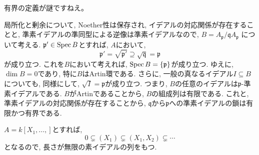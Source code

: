 \documentclass[dvipdfmx]{jsarticle}
\begin{document}
    \begin{problem}
        \color{red}
            有界の定義が謎ですねえ。
        \color{black}
    \end{problem}


    \begin{problem}
        局所化と剰余について, Noether性は保存され, イデアルの対応関係が存在することと,
        準素イデアルの準同型による逆像は準素イデアルなので,
        $B = A_\mathfrak{p}/\mathfrak{q}A_\mathfrak{p}$
        について考える.
        $\mathfrak{p}' \in \operatorname{Spec}{B}$とすれば, $A$において,
        \[
            \mathfrak{p}' = \sqrt{\mathfrak{p}'} \supseteq \sqrt{\mathfrak{q}} = \mathfrak{p}
        \]
        が成り立つ.
        これを$B$において考えれば, $\operatorname{Spec}{B} = \{\mathfrak{p}\}$が成り立つ.
        ゆえに, $\dim{B} = 0$であり, 特に$B$はArtin環である.
        さらに, 一般の真なるイデアル$I\subseteq B$についても, 同様にして, $\sqrt{I} = \mathfrak{p}$が成り立つ.
        つまり, $B$の任意のイデアルは$\mathfrak{p}$-準素イデアルである.
        $B$がArtinであることから, $B$の組成列は有限である.
        これと, 準素イデアルの対応関係が存在することから, $\mathfrak{q}$から$\mathfrak{p}$への準素イデアルの鎖は有限かつ有界である.
    \end{problem}

    \begin{note}
        $A = k[X_1, \dots, ]$とすれば,
        \[
            0 \subsetneq (X_1) \subsetneq (X_1, X_2) \subsetneq \cdots
        \]
        となるので, 長さが無限の素イデアルの列をもつ.
    \end{note}
\end{document}

